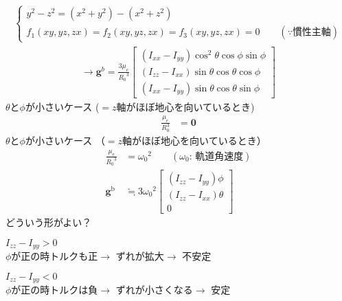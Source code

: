\documentclass[class=article, crop=false, dvipdfmx, fleqn]{standalone}
\begin{document}
\begin{align}
\left\{
\begin{array}{l}
y^2-z^2=(x^2+y^2)-(x^2+z^2)\\
f_1(xy,yz,zx)=f_2(xy,yz,zx)=f_3(xy,yz,zx)=0
\qquad (\because\text{慣性主軸})
\end{array}
\right.
\end{align}
\begin{align}
\rightarrow \bm{g}^b = \frac{3\mu_e}{{R_0}^3}
\begin{bmatrix}
(I_{xx}-I_{yy})\cos^2{\theta}
\cos{\phi} \sin{\phi} \\
(I_{zz}- I_{xx})\sin\theta\cos\theta\cos
\phi\\
(I_{xx}-I_{yy})\sin\theta\cos\theta\sin\phi
\end{bmatrix}
\end{align}
$\theta$と$\phi$が小さいケース
($=z$軸がほぼ地心を向いているとき)
\begin{align}
\frac{\mu_e}{R_0^3}&=\bm{0}
\end{align}
$\theta$と$\phi$が小さいケース
（$= z$軸がほぼ地心を向いているとき）
\begin{align}
\frac{\mu_\mathrm{e}}{{R_0}^3} & = {\omega_0}^2 \qquad (\omega_0 \text{: 軌道角速度}) \\
\bm{g}^\mathrm{b} & \fallingdotseq 3 {\omega_0}^2
\begin{bmatrix}
(I_{zz} - I_{yy}) \phi \\
(I_{zz} - I_{xx}) \theta \\
0
\end{bmatrix}
\end{align}
どういう形がよい？



\begin{minipage}{.4\textwidth}

\end{minipage}
\hfill
\begin{minipage}{.4\textwidth}
$I_{zz}-I_{yy}>0$\\
$\phi$が正の時トルクも正$\rightarrow$
ずれが拡大$\rightarrow$
不安定
\end{minipage}

\begin{minipage}{.4\textwidth}

\end{minipage}
\hfill
\begin{minipage}{.4\textwidth}
$I_{zz}-I_{yy}<0$\\
$\phi$が正の時トルクは負$\rightarrow$
ずれが小さくなる$\rightarrow$
安定
\end{minipage}
\end{document}
